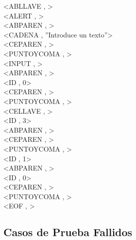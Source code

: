 \documentclass{article}
\begin{document}
\begin{flushleft}
<ABLLAVE , >\\
<ALERT , >\\
<ABPAREN , >\\
<CADENA , ''Introduce un texto''>\\
<CEPAREN , >\\
<PUNTOYCOMA , >\\
<INPUT , >\\
<ABPAREN , >\\
<ID , 0>\\
<CEPAREN , >\\
<PUNTOYCOMA , >\\
<CELLAVE , >\\
<ID , 3>\\
<ABPAREN , >\\
<CEPAREN , >\\
<PUNTOYCOMA , >\\
<ID , 1>\\
<ABPAREN , >\\
<ID , 0>\\
<CEPAREN , >\\
<PUNTOYCOMA , >\\
<EOF , >\\
\end{flushleft}


\subsection{Casos de Prueba Fallidos}
\clearpage
\end{document}
